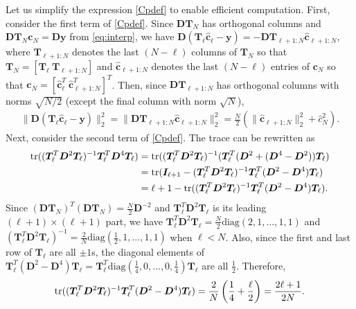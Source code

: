 \documentclass[final,onefignum,onetabnum]{siamart220329}
\newcommand{\vct}[1]{\bm{#1}}
\newcommand{\mtx}[1]{\bm{#1}}
\begin{document}
Let us simplify the expression \eqref{Cpdef} to enable efficient computation. 
First, consider the first term of \eqref{Cpdef}.
Since 
$\mtx{D} \mtx{T}_{N}$ has orthogonal columns and $\mtx{D} \mtx{T}_{N} \vct{c}_N = \mtx{D} \vct{y}$ from \eqref{eq:interp}, we have
$\mtx{D} (\mtx{T}_{\ell} \hat{\vct{c}}_{\ell} - \vct{y})
=-\mtx{D} \mtx{T}_{\ell+1:N} \hat{\vct{c}}_{\ell+1:N}$, 
where $\mtx{T}_{\ell+1:N}$ denotes the last $(N-\ell)$ columns of $\mtx{T}_N$ so that $\mtx{T}_N = [\mtx{T}_{\ell} \ \mtx{T}_{\ell+1:N}]$ and $\hat{\vct{c}}_{\ell+1:N}$ denotes the last $(N-\ell)$ entries of $\vct{c}_N$ so that 
$\vct{c}_N = [\hat{\vct{c}}_{\ell}^T \ \hat{\vct{c}}_{\ell+1:N}^T]^T$.
Then, since 
$\mtx{D} \mtx{T}_{\ell+1:N}$ has orthogonal columns with norms $\sqrt{{N}/{2}}$ (except the final column with norm {$\sqrt{N}$}), 
\begin{align*}
	\|\mtx{D} (\mtx{T}_{\ell} \hat{\vct{c}}_{\ell} - \vct{y})\|_2^2 = \| \mtx{D} \mtx{T}_{\ell+1:N} \hat{\vct{c}}_{\ell+1:N} \|_2^2 = \frac{N}{2}(\|\hat{\vct{c}}_{\ell+1:N}\|_2^2+\hat{c}_{N}^2). 
\end{align*}
Next, consider the second term of \eqref{Cpdef}.
The trace can be rewritten as
\begin{align*}
	{\rm tr} ((\mtx{T}_{\ell}^T \mtx{D}^2 \mtx{T}_{\ell})^{-1} \mtx{T}_{\ell}^T \mtx{D}^4\mtx{T}_{\ell} )  &=
	{\rm tr} ((\mtx{T}_{\ell}^T \mtx{D}^2 \mtx{T}_{\ell})^{-1}
	(\mtx{T}_{\ell}^T (\mtx{D}^2 + (\mtx{D}^4 -\mtx{D}^2 ) ) \mtx{T}_{\ell} )  \\
	&=
	{\rm tr} (\mtx{I}_{\ell+1}-
	(\mtx{T}_{\ell}^T \mtx{D}^2 \mtx{T}_{\ell})^{-1}
	\mtx{T}_{\ell}^T (\mtx{D}^2-\mtx{D}^4 )  \mtx{T}_{\ell} ) \\
	&=
	\ell+1 - {\rm tr} (
	(\mtx{T}_{\ell}^T \mtx{D}^2 \mtx{T}_{\ell})^{-1}
	\mtx{T}_{\ell}^T (\mtx{D}^2-\mtx{D}^4 )  \mtx{T}_{\ell} ).
\end{align*}
Since $(\mtx{DT}_N)^T(\mtx{DT}_N)=\frac{N}{2}\mtx{D}^{-2}$ and $\mtx{T}_{\ell}^T \mtx{D}^2 \mtx{T}_{\ell}$ is its leading 
$(\ell+1)\times (\ell+1)$ part, we have 
$\mtx{T}_{\ell}^T \mtx{D}^2 \mtx{T}_{\ell}=\frac{N}{2}\mbox{diag}(2,1,\ldots,1,1)$ and $(\mtx{T}_{\ell}^T \mtx{D}^2 \mtx{T}_{\ell})^{-1}=
\frac{2}{N}\mbox{diag}(\frac{1}{2},1,\ldots,1,1)$ when $\ell<N$. 
Also, since the first and last row of $\mtx{T}_{\ell}$ are all $\pm 1$s, the diagonal elements of
$
\mtx{T}_{\ell}^T (\mtx{D}^2 -\mtx{D}^4 )  \mtx{T}_{\ell} 
=
\mtx{T}_{\ell}^T \mbox{diag}(\frac{1}{4},0,\ldots,0,\frac{1}{4})  \mtx{T}_{\ell}$ are all $\frac{1}{2}$. Therefore,
\[
{\rm tr} ((\mtx{T}_{\ell}^T \mtx{D}^2 \mtx{T}_{\ell})^{-1}
\mtx{T}_{\ell}^T (\mtx{D}^2-\mtx{D}^4 )  \mtx{T}_{\ell} )
=\frac{2}{N}\left(\frac{1}{4}+\frac{\ell}{2}\right)=\frac{2\ell+1}{2N}. 
\]
\end{document}
